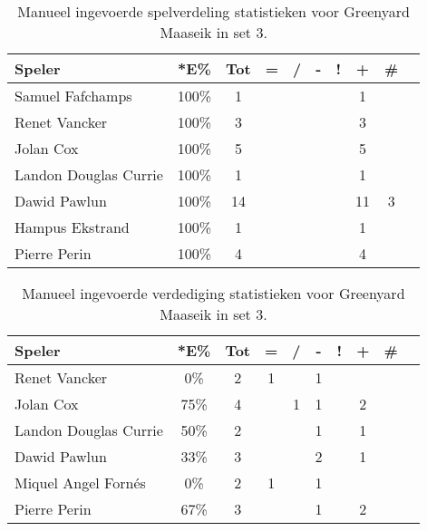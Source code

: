 \begin{table}[ht!]
    \centering
    \scriptsize
    \begin{tabular}{|l|c|c|c|c|c|c|c|c|c|} \hline
        \textbf{Speler} & *E\% & Tot & = & / & - & ! & + & \# \\ \hline
        Samuel Fafchamps  & 100\% & 1 &  &  &  &  & 1 &  \\ 
        Renet Vancker & 100\% & 3 &  &  &  &  & 3 &  \\
        Jolan Cox & 100\% & 5 &  &  &  &  & 5 &  \\ 
        Landon Douglas Currie & 100\% & 1 &  &  &  &  & 1 &  \\ 
        Dawid Pawlun & 100\% & 14 &  &  &  &  & 11 & 3 \\ 
        Hampus Ekstrand & 100\% & 1 &  &  &  &  & 1 &  \\
        Pierre Perin & 100\% & 4 &  &  &  &  & 4 &  \\ \hline
    \end{tabular}
    \caption[Manueel ingevoerde spelverdelingsstatistieken voor Greenyard Maaseik in set 3]{\label{tab:PL1SetMaaseikMan3}Manueel ingevoerde spelverdeling statistieken voor Greenyard Maaseik in set 3.}
\end{table}

\begin{table}[ht!]
    \centering
    \scriptsize
    \begin{tabular}{|l|c|c|c|c|c|c|c|c|c|} \hline
        \textbf{Speler} & *E\% & Tot & = & / & - & ! & + & \#\\ \hline
        Renet Vancker & 0\% & 2 & 1 &  & 1 &  &  &  \\ 
        Jolan Cox & 75\% & 4 &  & 1 & 1 &  & 2 &  \\ 
        Landon Douglas Currie & 50\% & 2 &  &  & 1 &  & 1 &  \\ 
        Dawid Pawlun & 33\% & 3 &  &  & 2 &  & 1 &  \\ 
        Miquel Angel Fornés & 0\% & 2 & 1 &  & 1 &  &  &  \\ 
        Pierre Perin & 67\% & 3 &  &  & 1 &  & 2 &  \\ \hline
    \end{tabular}
    \caption[Manueel ingevoerde verdedigingsstatistieken voor Greenyard Maaseik in set 3]{\label{tab:PL1DigMaaseikMan3}Manueel ingevoerde verdediging statistieken voor Greenyard Maaseik in set 3.}
\end{table}

